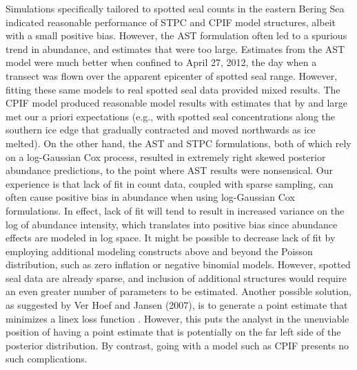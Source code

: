 \documentclass[12pt,english]{article}
\begin{document}
\begin{spacing}{1.9}
Simulations specifically tailored to spotted seal counts in the eastern Bering Sea indicated reasonable performance of STPC and CPIF model structures, albeit with a small positive bias.  However, the AST formulation often led to a spurious trend in abundance, and estimates that were too large.  Estimates from the AST model were much better when confined to April 27, 2012, the day when a transect was flown over the apparent epicenter of spotted seal range.  However, fitting these same models to real spotted seal data provided mixed results.  The CPIF model produced reasonable model results with estimates that by and large met our a priori expectations (e.g., with spotted seal concentrations along the southern ice edge that gradually contracted and moved northwards as ice melted).  On the other hand, the AST and STPC formulations, both of which rely on a log-Gaussian Cox process, resulted in extremely right skewed posterior abundance predictions, to the point where AST results were nonsensical.  Our experience \citep{VerHoefJansen2007,ConnEtAl2014} is that lack of fit in count data, coupled with sparse sampling, can often cause positive bias in abundance when using log-Gaussian Cox formulations.  In effect, lack of fit will tend to result in increased variance on the log of abundance intensity, which translates into positive bias since abundance effects are modeled in log space.  It might be possible to decrease lack of fit by employing additional modeling constructs above and beyond the Poisson distribution, such as zero inflation \citep{AgarwalEtAl2002,VerHoefJansen2007} or negative binomial models.  However, spotted seal data are already sparse, and inclusion of additional structures would require an even greater number of parameters to be estimated. Another possible solution, as suggested by Ver Hoef and Jansen (2007), is to generate a point estimate that minimizes a linex loss function \citep{Varian1975}.  However, this puts the analyst in the unenviable position of having a point estimate that is potentially on the far left side of the posterior distribution.  By contrast, going with a model such as CPIF presents no such complications.


\end{spacing}
\end{document}
